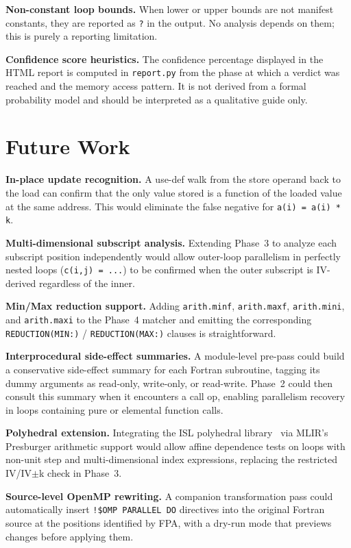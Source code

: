 \documentclass[conference]{IEEEtran}
\begin{document}
\textbf{Non-constant loop bounds.}
When lower or upper bounds are not manifest constants, they are
reported as \texttt{?} in the output.  No analysis depends on them;
this is purely a reporting limitation.

\textbf{Confidence score heuristics.}
The confidence percentage displayed in the HTML report is computed in
\texttt{report.py} from the phase at which a verdict was reached and
the memory access pattern.  It is not derived from a formal
probability model and should be interpreted as a qualitative guide
only.

\section{Future Work}
\label{sec:future}

\textbf{In-place update recognition.}
A use-def walk from the store operand back to the load can confirm that
the only value stored is a function of the loaded value at the same
address.  This would eliminate the false negative for \texttt{a(i) =
a(i) * k}.

\textbf{Multi-dimensional subscript analysis.}
Extending Phase~3 to analyze each subscript position independently
would allow outer-loop parallelism in perfectly nested loops
(\texttt{c(i,j) = ...}) to be confirmed when the outer subscript is
IV-derived regardless of the inner.

\textbf{Min/Max reduction support.}
Adding \texttt{arith.minf}, \texttt{arith.maxf}, \texttt{arith.mini},
and \texttt{arith.maxi} to the Phase~4 matcher and emitting the
corresponding \texttt{REDUCTION(MIN:)} / \texttt{REDUCTION(MAX:)}
clauses is straightforward.

\textbf{Interprocedural side-effect summaries.}
A module-level pre-pass could build a conservative side-effect summary
for each Fortran subroutine, tagging its dummy arguments as read-only,
write-only, or read-write.  Phase~2 could then consult this summary
when it encounters a call op, enabling parallelism recovery in loops
containing pure or elemental function calls.

\textbf{Polyhedral extension.}
Integrating the ISL polyhedral library~\cite{verdoolaege2010isl} via
MLIR's Presburger arithmetic support would allow affine dependence
tests on loops with non-unit step and multi-dimensional index
expressions, replacing the restricted IV/IV$\pm$k check in Phase~3.

\textbf{Source-level OpenMP rewriting.}
A companion transformation pass could automatically insert
\texttt{!\$OMP PARALLEL DO} directives into the original Fortran source
at the positions identified by FPA, with a dry-run mode that previews
changes before applying them.
\end{document}
